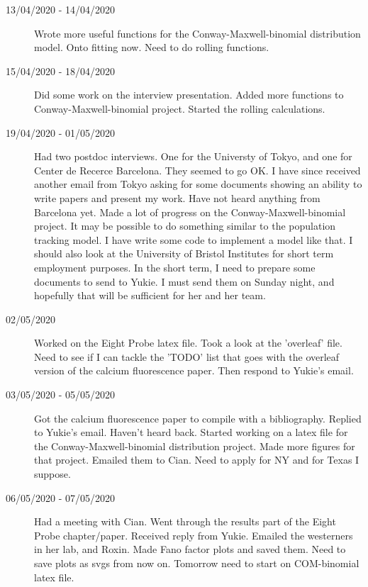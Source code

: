 \documentclass[a4paper,12pt]{article}
\theoremstyle{definition}
\begin{document}
\begin{description}
                                \item[13/04/2020 - 14/04/2020] Wrote more useful functions for the Conway-Maxwell-binomial distribution model. Onto fitting now. Need to do rolling functions.

                                \item[15/04/2020 - 18/04/2020] Did some work on the interview presentation. Added more functions to Conway-Maxwell-binomial project. Started the rolling calculations.
                                \item[19/04/2020 - 01/05/2020] Had two postdoc interviews. One for the Universty of Tokyo, and one for Center de Recerce Barcelona. They seemed to go OK. I have since received another email from Tokyo asking for some documents showing an ability to write papers and present my work. Have not heard anything from Barcelona yet. Made a lot of progress on the Conway-Maxwell-binomial project. It may be possible to do something similar to the population tracking model. I have write some code to implement a model like that. I should also look at the University of Bristol Institutes for short term employment purposes. In the short term, I need to prepare some documents to send to Yukie. I must send them on Sunday night, and hopefully that will be sufficient for her and her team.

                                \item[02/05/2020] Worked on the Eight Probe latex file. Took a look at the 'overleaf' file. Need to see if I can tackle the 'TODO' list that goes with the overleaf version of the calcium fluorescence paper. Then respond to Yukie's email.

                                \item[03/05/2020 - 05/05/2020] Got the calcium fluorescence paper to compile with a bibliography. Replied to Yukie's email. Haven't heard back. Started working on a latex file for the Conway-Maxwell-binomial distribution project. Made more figures for that project. Emailed them to Cian. Need to apply for NY and for Texas I suppose.

                                \item[06/05/2020 - 07/05/2020] Had a meeting with Cian. Went through the results part of the Eight Probe chapter/paper. Received reply from Yukie. Emailed the westerners in her lab, and Roxin. Made Fano factor plots and saved them. Need to save plots as svgs from now on. Tomorrow need to start on COM-binomial latex file.

  \end{description}
\end{document}
